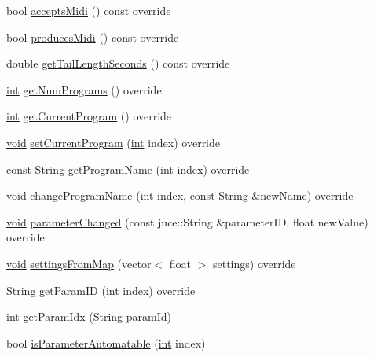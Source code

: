 \begin{DoxyCompactItemize}
bool \hyperlink{class_audealizereverb_audio_processor_a070d7a6bf9617fcf3e8ff901d973c3e4}{accepts\+Midi} () const  override
\item 
bool \hyperlink{class_audealizereverb_audio_processor_abd5d8bacc498bdac1eeea1bedd4b2e17}{produces\+Midi} () const  override
\item 
double \hyperlink{class_audealizereverb_audio_processor_a622a48a5741afbfe65114a031fd6521d}{get\+Tail\+Length\+Seconds} () const  override
\item 
\hyperlink{tk_8h_a83f82f76e7fed06f4c49d2db94028a6d}{int} \hyperlink{class_audealizereverb_audio_processor_a59f63e65b4ecadd00c3cc932a0538c21}{get\+Num\+Programs} () override
\item 
\hyperlink{tk_8h_a83f82f76e7fed06f4c49d2db94028a6d}{int} \hyperlink{class_audealizereverb_audio_processor_a1088d42f1aa689ff1b5122d372739888}{get\+Current\+Program} () override
\item 
\hyperlink{tk_8h_aba408b7cd755a96426e004c015f5de8e}{void} \hyperlink{class_audealizereverb_audio_processor_a47fc36254b2bef0a0427143868e0128e}{set\+Current\+Program} (\hyperlink{tk_8h_a83f82f76e7fed06f4c49d2db94028a6d}{int} index) override
\item 
const String \hyperlink{class_audealizereverb_audio_processor_ab9f79aecbdb3781429d5903a29116e0c}{get\+Program\+Name} (\hyperlink{tk_8h_a83f82f76e7fed06f4c49d2db94028a6d}{int} index) override
\item 
\hyperlink{tk_8h_aba408b7cd755a96426e004c015f5de8e}{void} \hyperlink{class_audealizereverb_audio_processor_ac24bb57c2e0a915d93597c8b40a947cf}{change\+Program\+Name} (\hyperlink{tk_8h_a83f82f76e7fed06f4c49d2db94028a6d}{int} index, const String \&new\+Name) override
\item 
\hyperlink{tk_8h_aba408b7cd755a96426e004c015f5de8e}{void} \hyperlink{class_audealizereverb_audio_processor_aafb771cae87f2ce62ca2451d80678277}{parameter\+Changed} (const juce\+::\+String \&parameter\+ID, float new\+Value) override
\item 
\hyperlink{tk_8h_aba408b7cd755a96426e004c015f5de8e}{void} \hyperlink{class_audealizereverb_audio_processor_a4a9a5828a3cbbb084a3025009500faf9}{settings\+From\+Map} (vector$<$ float $>$ settings) override
\item 
String \hyperlink{class_audealizereverb_audio_processor_a20e3cb24628efda50a559ce164a7fed5}{get\+Param\+ID} (\hyperlink{tk_8h_a83f82f76e7fed06f4c49d2db94028a6d}{int} index) override
\item 
\hyperlink{tk_8h_a83f82f76e7fed06f4c49d2db94028a6d}{int} \hyperlink{class_audealizereverb_audio_processor_a10250897a1cd4d63389f27deae3d615b}{get\+Param\+Idx} (String param\+Id)
\item 
bool \hyperlink{class_audealizereverb_audio_processor_a1233c7d9e299f5d54528587eb38c63c0}{is\+Parameter\+Automatable} (\hyperlink{tk_8h_a83f82f76e7fed06f4c49d2db94028a6d}{int} index)
\end{DoxyCompactItemize}
